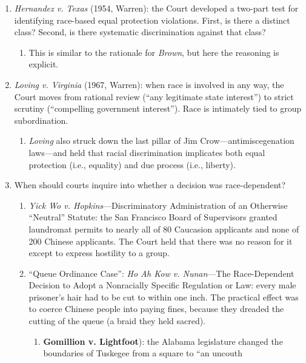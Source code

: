 \begin{enumerate}
    \item \emph{Hernandez v. Texas} (1954, Warren): the Court developed a 
    two-part test for identifying race-based equal protection violations.  
    First, is there a distinct class? Second, is there systematic 
    discrimination against that class?
    \begin{enumerate}
        \item This is similar to the rationale for \emph{Brown}, but here the 
        reasoning is explicit.
    \end{enumerate}
    \item \emph{Loving v. Virginia} (1967, Warren): when race is involved in 
    any way, the Court moves from rational review (``any legitimate state 
    interest'') to strict scrutiny (``compelling government interest''). Race 
    is intimately tied to group subordination.
    \begin{enumerate}
        \item \emph{Loving} also struck down the last pillar of Jim 
        Crow---antimiscegenation laws---and held that racial discrimination 
        implicates both equal protection (i.e., equality) and due process 
        (i.e., liberty).
    \end{enumerate}
    \item When should courts inquire into whether a decision was 
    race-dependent?
    \begin{enumerate}
        \item \emph{Yick Wo v. Hopkins}---Discriminatory 
        Administration of an Otherwise ``Neutral'' Statute: the San Francisco 
        Board of Supervisors granted laundromat permits to nearly all of 80 
        Caucasion applicants and none of 200 Chinese applicants. The Court 
        held that there was no reason for it except to express hostility to a 
        group.
        \item ``Queue Ordinance Case'': \emph{Ho Ah Kow v. 
        Nunan}---The Race-Dependent Decision to Adopt a Nonracially Specific 
        Regulation or Law: every male prisoner's hair had to be cut to within 
        one inch. The practical effect was to coerce Chinese people into 
        paying fines, because they dreaded the cutting of the queue (a braid 
        they held sacred).
        \begin{enumerate}
            \item \textbf{Gomillion v. Lightfoot}): the Alabama legislature 
            changed the boundaries of Tuskegee from a square to ``an uncouth 

\end{enumerate}
\end{enumerate}
\end{enumerate}
